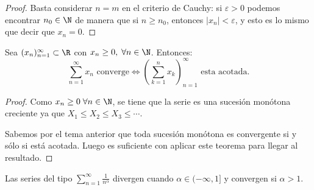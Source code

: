 \begin{proof}
	Basta considerar \(n = m \) en el criterio de Cauchy: si \( \varepsilon > 0 \) podemos encontrar \(n_0 \in \N\) de manera que si \(n \geq n_0\), entonces \(\left\vert x_n \right\vert < \varepsilon\), y esto es lo mismo que decir que \(x_n = 0\).     
\end{proof}
\begin{proposition}
	Sea \((x_n)^{\infty}_{n=1} \subset \R \) con \(x_n \geq 0, \; \forall n \in \N \). Entonces:
	\[
		\sum_{n =1}^{\infty} x_n \text{ converge} \iff (\sum_{k =1}^{n } x_k )^{\infty}_{n=1} \text{ esta acotada}.
	\]
\end{proposition}
\begin{proof}
	Como \(x_n \geq 0 \; \forall n \in \N\), se tiene que la serie es una sucesión monótona creciente ya que \(X_1 \leq X_2 \leq X_3 \leq \cdots \). 
	
	Sabemos por el tema anterior que toda sucesión monótona es convergente si y sólo si está acotada. Luego es suficiente con aplicar este teorema para llegar al resultado. 
\end{proof}

\begin{proposition}
	\label{serieacot}
	Las series del tipo \(\sum_{n =1}^{\infty} \frac{1}{n^{\alpha} } \) divergen cuando \(\alpha \in (-\infty, 1] \) y convergen si \(\alpha > 1 \).
\end{proposition}

